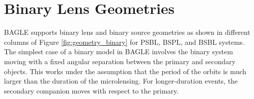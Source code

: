 \documentclass[twocolumn]{aastex701}
\newcommand{\tE}{t_{E,\sun}}
\begin{document}







\section{Binary Lens Geometries}
\label{sec:binary_geometry}

BAGLE supports binary lens and binary source geometries as shown in different columns of Figure \ref{fig:geometry_binary} for PSBL, BSPL, and BSBL systems.
The simplest case of a binary model in BAGLE involves the binary system moving with a fixed angular separation between the primary and secondary objects. This works under the assumption that the period of the orbits is much larger than the duration of the microlensing. For longer-duration events, the secondary companion moves with respect to the primary.
\end{document}
